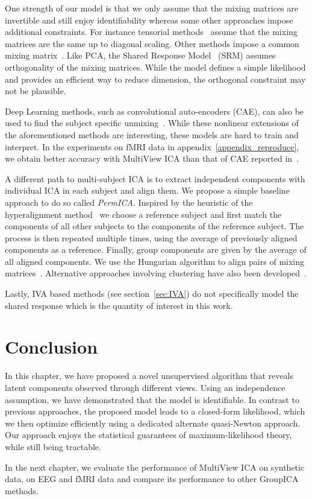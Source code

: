 One strength of our model is that we only assume that the mixing matrices are invertible and still enjoy identifiability whereas some other approaches impose additional constraints. For instance tensorial methods~\cite{beckmann2005tensorial} assume that the mixing matrices are the same up to diagonal scaling.
Other methods impose a common mixing matrix~\cite{cong2013validating, grin2010independent, calhoun2001fmri, Monti18UAI}. Like PCA, the Shared Response Model~\cite{chen2015reduced} (SRM) assumes orthogonality of the mixing matrices. While the model defines a simple likelihood and provides an efficient way to reduce dimension, the orthogonal constraint may not be plausible.

Deep Learning methods, such as convolutional auto-encoders (CAE), can also be used to find the subject specific unmixing~\cite{chen2016convolutional}. While these nonlinear extensions of the aforementioned methods are interesting, these models are hard to train and interpret. In the experiments on fMRI data in appendix~\ref{appendix_reproduce}, we obtain better accuracy with MultiView ICA than that of CAE reported in~\cite{chen2016convolutional}.

A different path to multi-subject ICA is to extract independent components with individual ICA in each subject and align them. We propose a simple baseline approach to do so called \emph{PermICA}.
Inspired by the heuristic of the hyperalignment method~\cite{haxby2011common} we choose a reference subject and first match the components of all other subjects to the components of the reference subject. The process is then repeated multiple times, using the average of previously aligned components as a reference. Finally, group components are given by the average of all aligned components. We use the Hungarian algorithm to align pairs of mixing matrices~\cite{tichavsky2004optimal}.
Alternative approaches involving clustering have also been developed~\cite{esposito2005independent,bigdely2013measure}.

Lastly, IVA based methods (see section~\ref{sec:IVA}) do not specifically model
the shared response which is the quantity of interest in this work.

\section{Conclusion}
In this chapter, we have proposed a novel unsupervised algorithm that reveals latent components observed through different views. Using an independence assumption, 
we have demonstrated that the model is identifiable.
% 
In contrast to previous approaches, the proposed model leads to a closed-form likelihood, which we then optimize efficiently using a dedicated alternate quasi-Newton approach.
% 
Our approach enjoys the statistical guarantees of maximum-likelihood theory, while still being tractable.
% 

In the next chapter, we evaluate the performance of MultiView ICA on synthetic
data, on EEG and fMRI data and compare its performance to other GroupICA methods.
